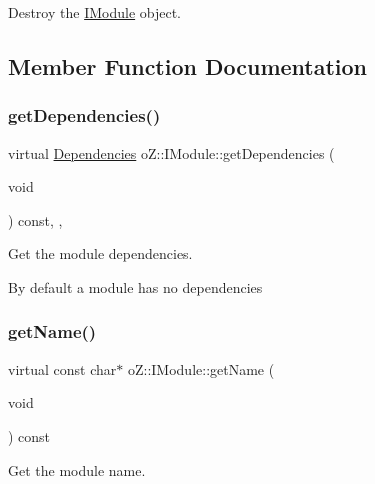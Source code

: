 Destroy the \mbox{\hyperlink{classo_z_1_1_i_module}{I\+Module}} object. 



\subsection{Member Function Documentation}
\mbox{\label{classo_z_1_1_i_module_a720a329e6ebcbecbc150d8b0bbee6e37}} 
\subsubsection{\texorpdfstring{getDependencies()}{getDependencies()}}
{\footnotesize\ttfamily virtual \mbox{\hyperlink{classo_z_1_1_i_module_ac13210556cb2a65d186bfbe5208c666c}{Dependencies}} o\+Z\+::\+I\+Module\+::get\+Dependencies (\begin{DoxyParamCaption}\item[{void}]{ }\end{DoxyParamCaption}) const\hspace{0.3cm}{\ttfamily [inline]}, {\ttfamily [virtual]}, {\ttfamily [noexcept]}}



Get the module dependencies. 

By default a module has no dependencies \mbox{\label{classo_z_1_1_i_module_af41d45158fd28e1bd86a34e25f5282d6}} 
\subsubsection{\texorpdfstring{getName()}{getName()}}
{\footnotesize\ttfamily virtual const char$\ast$ o\+Z\+::\+I\+Module\+::get\+Name (\begin{DoxyParamCaption}\item[{void}]{ }\end{DoxyParamCaption}) const\hspace{0.3cm}{\ttfamily [pure virtual]}}



Get the module name. 

\mbox{\label{classo_z_1_1_i_module_a8acf56655f9e59a8a04afd8b0adf79d6}} 
